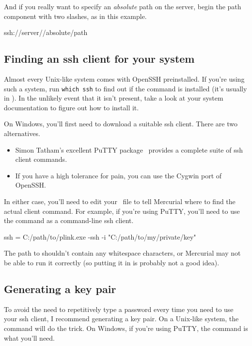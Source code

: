 And if you really want to specify an \emph{absolute} path on the
server, begin the path component with two slashes, as in this example.
\begin{codesample2}
  ssh://server//absolute/path
\end{codesample2}

\subsection{Finding an ssh client for your system}

Almost every Unix-like system comes with OpenSSH preinstalled.  If
you're using such a system, run \Verb|which ssh| to find out if
the  command is installed (it's usually in
).  In the unlikely event that it isn't present,
take a look at your system documentation to figure out how to install
it.

On Windows, you'll first need to download a suitable ssh
client.  There are two alternatives.
\begin{itemize}
\item Simon Tatham's excellent PuTTY package~\cite{web:putty} provides
  a complete suite of ssh client commands.
\item If you have a high tolerance for pain, you can use the Cygwin
  port of OpenSSH.
\end{itemize}
In either case, you'll need to edit your \hgini\ file to tell
Mercurial where to find the actual client command.  For example, if
you're using PuTTY, you'll need to use the  command as
a command-line ssh client.
\begin{codesample2}
  [ui]
  ssh = C:/path/to/plink.exe -ssh -i "C:/path/to/my/private/key"
\end{codesample2}

\begin{note}
  The path to  shouldn't contain any whitespace
  characters, or Mercurial may not be able to run it correctly (so
  putting it in  is probably not a good
  idea).
\end{note}

\subsection{Generating a key pair}

To avoid the need to repetitively type a password every time you need
to use your ssh client, I recommend generating a key pair.  On a
Unix-like system, the  command will do the trick.
On Windows, if you're using PuTTY, the  command is
what you'll need.

